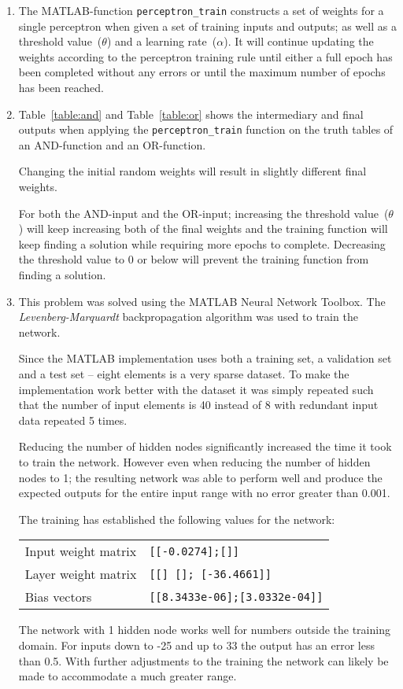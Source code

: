 \begin{enumerate}
\item The \textsc{MATLAB}-function \texttt{perceptron\_train} constructs a set of weights for a single perceptron when given a set of training inputs and outputs; as well as a threshold value~($\theta$) and a learning rate~($\alpha$). It will continue updating the weights according to the perceptron training rule until either a full epoch has been completed without any errors or until the maximum number of epochs has been reached.

\item Table~\ref{table:and} and Table~\ref{table:or} shows the intermediary and final outputs when applying the \texttt{perceptron\_train} function on the truth tables of an \textsc{AND}-function and an \textsc{OR}-function.

Changing the initial random weights will result in slightly different final weights.

For both the \textsc{AND}-input and the \textsc{OR}-input; increasing the threshold value~($\theta$) will keep increasing both of the final weights and the training function will keep finding a solution while requiring more epochs to complete. Decreasing the threshold value to 0 or below will prevent the training function from finding a solution.

\item This problem was solved using the \textsc{MATLAB} Neural Network Toolbox. The \textit{Levenberg-Marquardt} backpropagation algorithm was used to train the network.

Since the \textsc{MATLAB} implementation uses both a training set, a validation set and a test set -- eight elements is a very sparse dataset. To make the implementation work better with the dataset it was simply repeated such that the number of input elements is 40 instead of 8 with redundant input data repeated 5 times.

Reducing the number of hidden nodes significantly increased the time it took to train the network. However even when reducing the number of hidden nodes to 1; the resulting network was able to perform well and produce the expected outputs for the entire input range with no error greater than 0.001.

The training has established the following values for the network:

\begin{tabular}{ll}
Input weight matrix & \texttt{[[-0.0274];[]]} \\
Layer weight matrix & \texttt{[[] []; [-36.4661]]} \\
Bias vectors        & \texttt{[[8.3433e-06];[3.0332e-04]]} \\
\end{tabular}

The network with 1 hidden node works well for numbers outside the training domain. For inputs down to -25 and up to 33 the output has an error less than 0.5. With further adjustments to the training the network can likely be made to accommodate a much greater range.

\end{enumerate}

